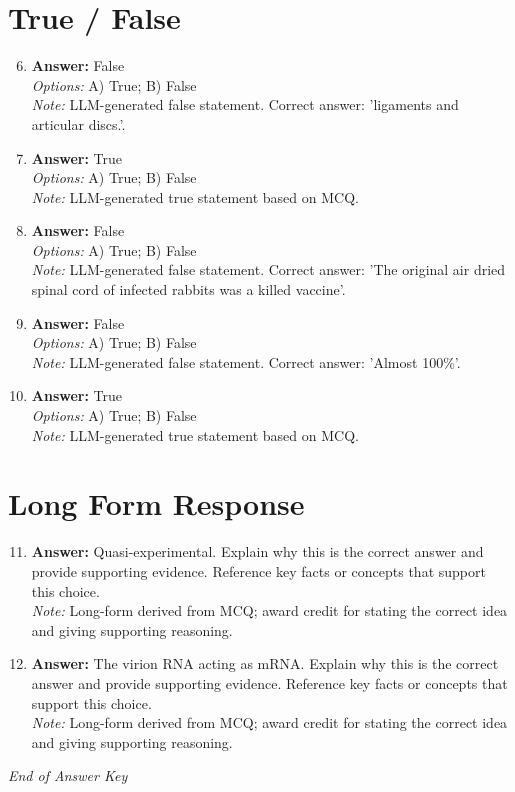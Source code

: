 \documentclass[12pt]{article}
\begin{document}
\section*{True / False}
\begin{enumerate}[label=\arabic*.]
\setcounter{enumi}{5}
\item \textbf{Answer:} False
\\ \textit{Options:} A) True; B) False
\\ \textit{Note:} LLM-generated false statement. Correct answer: 'ligaments and articular discs.'.
\item \textbf{Answer:} True
\\ \textit{Options:} A) True; B) False
\\ \textit{Note:} LLM-generated true statement based on MCQ.
\item \textbf{Answer:} False
\\ \textit{Options:} A) True; B) False
\\ \textit{Note:} LLM-generated false statement. Correct answer: 'The original air dried spinal cord of infected rabbits was a killed vaccine'.
\item \textbf{Answer:} False
\\ \textit{Options:} A) True; B) False
\\ \textit{Note:} LLM-generated false statement. Correct answer: 'Almost 100\%'.
\item \textbf{Answer:} True
\\ \textit{Options:} A) True; B) False
\\ \textit{Note:} LLM-generated true statement based on MCQ.
\end{enumerate}

\section*{Long Form Response}
\begin{enumerate}[label=\arabic*.]
\setcounter{enumi}{10}
\item \textbf{Answer:} Quasi-experimental. Explain why this is the correct answer and provide supporting evidence. Reference key facts or concepts that support this choice.
\\ \textit{Note:} Long-form derived from MCQ; award credit for stating the correct idea and giving supporting reasoning.
\item \textbf{Answer:} The virion RNA acting as mRNA. Explain why this is the correct answer and provide supporting evidence. Reference key facts or concepts that support this choice.
\\ \textit{Note:} Long-form derived from MCQ; award credit for stating the correct idea and giving supporting reasoning.
\end{enumerate}

\vfill
\noindent\textit{End of Answer Key}
\end{document}
